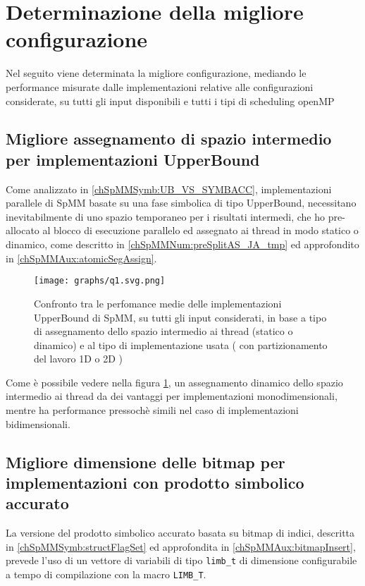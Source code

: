 \section{Determinazione della migliore configurazione}	\label{bestConf}
Nel seguito viene determinata la migliore configurazione, mediando le performance misurate dalle implementazioni relative alle configurazioni considerate,
su tutti gli input disponibili e tutti i tipi di scheduling openMP

\subsection{Migliore assegnamento di spazio intermedio per implementazioni UpperBound}
Come analizzato in \ref{chSpMMSymb:UB_VS_SYMBACC}, implementazioni parallele di SpMM basate su una fase simbolica di tipo UpperBound,
necessitano inevitabilmente di uno spazio temporaneo per i risultati intermedi, 
che ho pre-allocato al blocco di esecuzione parallelo 
ed assegnato ai thread in modo statico o dinamico, 
come descritto in \ref{chSpMMNum:preSplitAS_JA_tmp} ed approfondito in \ref{chSpMMAux:atomicSegAssign}.\\

\begin{figure}[H]
  \centering \texttt{[image: graphs/q1.svg.png]}
  \caption{Confronto tra le perfomance medie delle implementazioni UpperBound di SpMM, su tutti gli input considerati, in base a
		tipo di assegnamento dello spazio intermedio ai thread (statico o dinamico) e al tipo di implementazione usata 
		( con partizionamento del lavoro 1D o 2D ) }
  \decoRule \label{fig:q1}
\end{figure}

Come è possibile vedere nella figura \ref{fig:q1}, un assegnamento dinamico dello spazio intermedio ai thread da dei vantaggi
per implementazioni monodimensionali, mentre ha performance pressochè simili nel caso di implementazioni bidimensionali.\\

\subsection{Migliore dimensione delle bitmap per implementazioni con prodotto simbolico accurato}
La versione del prodotto simbolico accurato basata su bitmap di indici, descritta in \ref{chSpMMSymb:structFlagSet} 
ed approfondita in \ref{chSpMMAux:bitmapInsert}, prevede l'uso di un vettore di variabili di tipo \verb|limb_t|
di dimensione configurabile a tempo di compilazione con la macro \verb|LIMB_T|.\\

